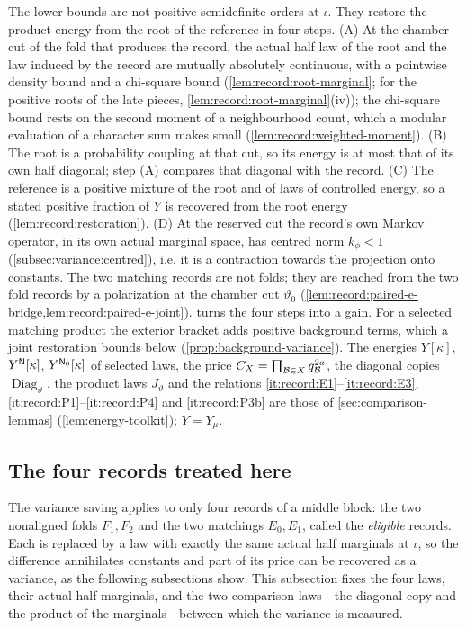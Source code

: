 The lower bounds are not positive semidefinite orders at $\iota$. They restore
the product energy from the root of the reference in four steps. (A) At the
chamber cut of the fold that produces the record, the actual half law of the
root and the law induced by the record are mutually absolutely continuous,
with a pointwise density bound and a chi-square bound
(\cref{lem:record:root-marginal}; for the positive roots of the late
pieces, \cref{lem:record:root-marginal}(iv)); the chi-square bound rests on the
second moment of a neighbourhood count, which a modular evaluation of a
character sum makes small (\cref{lem:record:weighted-moment}). (B) The root is
a probability coupling at that cut, so its energy is at most that
of its own half diagonal; step (A) compares that diagonal with
the record. (C) The reference is a positive mixture of the root
and of laws of controlled energy, so a stated positive fraction
of $Y$ is recovered from the root energy
(\cref{lem:record:restoration}). (D) At the reserved cut the
record's own Markov operator, in its own actual marginal space,
has centred norm $k_\phi<1$ (\cref{subsec:variance:centred}),
i.e. it is a contraction towards the projection onto constants. The two
matching records are not folds; they are reached from the two fold records by
a polarization at the chamber cut $\vartheta_0$
(\cref{lem:record:paired-e-bridge,lem:record:paired-e-joint}).
 turns the four steps into a gain. For a selected matching
product the exterior bracket adds positive background terms, which a joint
restoration bounds below (\cref{prop:background-variance}). The energies
$Y[\kappa]$, $Y^{\mathsf N}[\kappa]$, $Y^{\mathsf N_0}[\kappa]$ of selected laws, the price
$C_X=\prod_{\mathcal B\in X}q_\mathcal B^{2a}$, the diagonal copies $\operatorname{Diag}_\vartheta$,
the product laws $J_\vartheta$ and the relations
\ref{it:record:E1}--\ref{it:record:E3}, \ref{it:record:P1}--\ref{it:record:P4} and
\ref{it:record:P3b} are those of \cref{sec:comparison-lemmas}
(\cref{lem:energy-toolkit}); $Y=Y_\mu$.

\subsection{The four records treated here}\label{subsec:variance:eligible}

The variance saving applies to only four records of a middle
block: the two nonaligned folds $F_1,F_2$ and the two matchings
$E_0,E_1$, called the \emph{eligible} records. Each is replaced
by a law with exactly the same actual half marginals at $\iota$,
so the difference annihilates constants and part of its price can
be recovered as a variance, as the following subsections show.
This subsection fixes the four laws, their actual half marginals,
and the two comparison laws---the diagonal copy and the product
of the marginals---between which the variance is measured.

